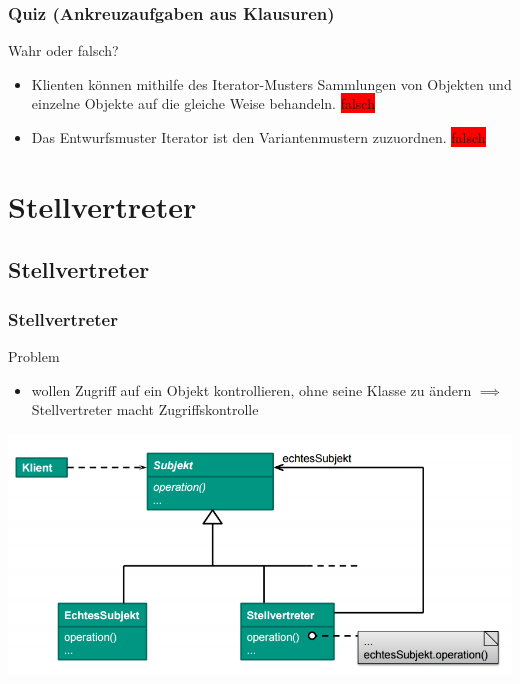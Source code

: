 \documentclass[18pt]{beamer}
\begin{document}
	\begin{frame}
		\frametitle{Quiz (Ankreuzaufgaben aus Klausuren)}
		Wahr oder falsch?
		\begin{itemize}
			\item Klienten können mithilfe des Iterator-Musters Sammlungen von Objekten und einzelne Objekte auf die gleiche Weise behandeln. \pause \colorbox{red}{falsch} \pause
			\item Das Entwurfsmuster Iterator ist den Variantenmustern zuzuordnen. \pause \colorbox{red}{falsch} 
		\end{itemize}
	\end{frame}

\section{Stellvertreter}
	\subsection{Stellvertreter}
	\begin{frame}
		\frametitle{Stellvertreter}
		\begin{block}{Problem}
			\begin{itemize}
				\item wollen Zugriff auf ein Objekt kontrollieren, ohne seine Klasse zu ändern \linebreak \pause $\implies$ Stellvertreter macht Zugriffskontrolle
			\end{itemize}
		\end{block}
		\pause
		\centering
		\includegraphics[scale=0.4]{./pics/tut3/prox.png}
	\end{frame}
\end{document}
